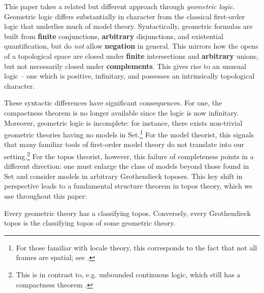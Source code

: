 \documentclass[a4paper, 11pt,reqno]{amsart}
\newcommand{\calE}{\mathcal{E}}
\newcommand{\Set}{\mathrm{Set}}
\newcommand{\baseS}{\mathcal{S}}
\newcommand{\thT}{\mathbb{T}}
\begin{document}
\smallskip

This paper takes a related but different approach through {\em geometric logic}. Geometric logic differs substantially in character from the classical first-order logic that underlies much of model theory. Syntactically, geometric formulas are built from \textbf{finite} conjunctions, \textbf{arbitrary} disjunctions, and existential quantification, but do {\em not} allow \textbf{negation} in general. This mirrors how the opens of a topological space are closed under \textbf{finite} intersections and \textbf{arbitrary} unions, but not necessarily closed under \textbf{complements}. This gives rise to an unusual logic -- one which is positive, infinitary, and possesses an intrinsically topological character. 

These syntactic differences have significant consequences. For one, the compactness theorem is no longer available since the logic is now infinitary. Moreover, geometric logic is incomplete: for instance, there exists non-trivial geometric theories having no models in $\Set$.\footnote{For those familiar with locale theory, this corresponds to the fact that not all frames are spatial; see \cite[\S 2.4]{Vi07}.} For the model theorist, this signals that many familiar tools of first-order model theory do not translate into our setting.\footnote{This is in contrast to, e.g. unbounded continuous logic, which still has a compactness theorem \cite[\S 3]{BY08}.} For the topos theorist, however, this failure of completeness points in a different direction: one must enlarge the class of models beyond those found in $\Set$ and consider models in arbitrary Grothendieck toposes. This key shift in perspective leads to a fundamental structure theorem in topos theory, which we use throughout this paper:

\begin{theorem}\label{thm:structure-thm}  Every geometric theory has a classifying topos. Conversely, every Grothendieck topos is the classifying topos of some geometric theory.
\end{theorem}


\end{document}
